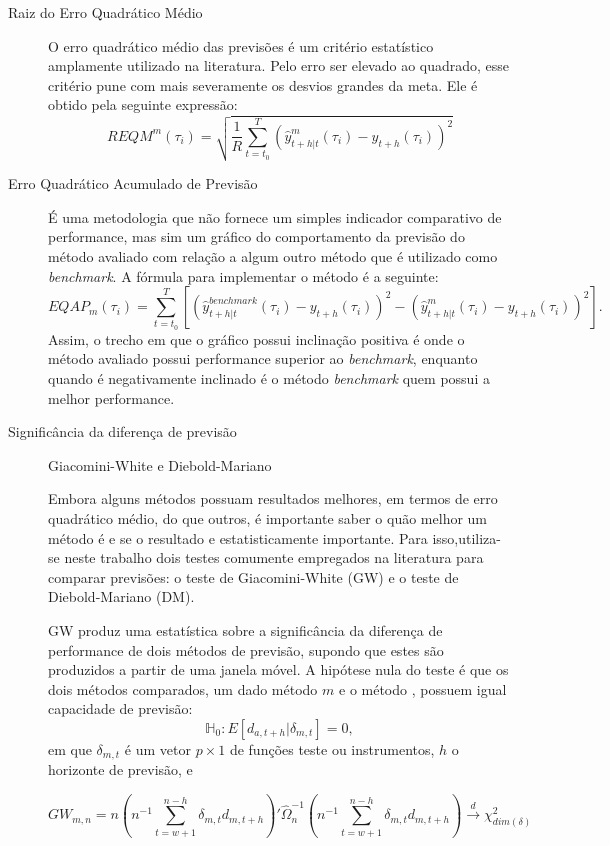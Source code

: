 \documentclass[
	12pt,				%
	openright,			%
	oneside,			%
	a4paper,			%
	english,			%
	brazil				%
	]{dissertacao-ufrgs-abntex2}
\begin{document}
\begin{description}
	\item[Raiz do Erro Quadrático Médio] O erro quadrático médio das previsões é um critério estatístico amplamente utilizado na literatura. Pelo erro ser elevado ao quadrado, esse critério pune com mais severamente os desvios grandes da meta. Ele é obtido pela seguinte expressão: \[ REQM^m(\tau_i) = \sqrt{ \frac{1}{R} \sum _{t = t_0}^T (\hat{y}_{t+h|t}^m(\tau_i) - y_{t+h}(\tau_i))^2 } \]
	\item[Erro Quadrático Acumulado de Previsão] É uma metodologia que não fornece um simples indicador comparativo de performance, mas sim um gráfico do comportamento da previsão do método avaliado com relação a algum outro método que é utilizado como \emph{benchmark}. A fórmula para implementar o método é a seguinte:
	\[ EQAP_{m}(\tau_i) = \sum_{t=t_0}^T  \left[ \left( \hat{y}_{t+h|t}^{benchmark}(\tau_i) - y_{t+h}(\tau_i) \right)^2 - \left( \hat{y}_{t+h|t}^m(\tau_i) - y_{t+h}(\tau_i) \right)^2 \right]. \]
Assim, o trecho em que o gráfico possui inclinação positiva é onde o método avaliado possui performance superior ao \emph{benchmark}, enquanto quando é negativamente inclinado é o método \emph{benchmark} quem possui a melhor performance.
	
	\item[Significância da diferença de previsão]
	
	Giacomini-White e Diebold-Mariano

Embora alguns métodos possuam resultados melhores, em termos de erro quadrático médio, do que outros, é importante saber o quão melhor um método é e se o resultado e estatisticamente importante. 
Para isso,utiliza-se neste trabalho dois testes comumente empregados na literatura para comparar previsões: o teste de 
Giacomini-White (GW) e o teste de Diebold-Mariano (DM).

GW produz uma estatística sobre a significância da diferença de performance de dois métodos de previsão, supondo que estes são 
produzidos a partir de uma janela móvel. A hipótese nula do teste é que os dois métodos comparados, um dado método $m$ e o método \bm, possuem igual capacidade de previsão:
\begin{equation}
\mathbb{H}_0:E[d_{a,t+h}|\delta_{m,t}]=0,
\end{equation}
em que $\delta_{m,t}$ é um vetor $p \times 1$ de funções teste ou instrumentos, $h$ o horizonte de previsão, e 

	
\begin{equation}
GW_{m,n} = n \left( n^{-1} \sum_{t=w+1}^{n-h} \delta_{m,t} d_{m,t+h} \right)' \hat{\Omega}_n^{-1}	
\left( n^{-1} \sum_{t=w+1}^{n-h} \delta_{m,t} d_{m,t+h} \right) \overset{d}{\longrightarrow} \chi_{dim(\delta)}^2
\end{equation}		
	
	
	
	
\end{description}
\end{document}
